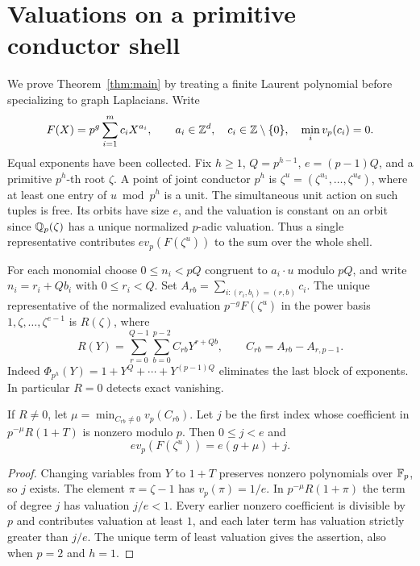 \section{Valuations on a primitive conductor shell}
\label{sec:local-shell}

We prove Theorem~\ref{thm:main} by treating a finite Laurent polynomial before
specializing to graph Laplacians. Write
\[
 F(X)=p^g\sum_{i=1}^m c_i X^{a_i},\qquad
 a_i\in\mathbb Z^d,\quad c_i\in\mathbb Z\setminus\{0\},\quad
 \min_i v_p(c_i)=0 .
\]
Equal exponents have been collected. Fix $h\ge1$, $Q=p^{h-1}$,
$e=(p-1)Q$, and a primitive $p^h$-th root $\zeta$.
A point of joint conductor $p^h$ is $\zeta^u=(\zeta^{u_1},\ldots,
\zeta^{u_d})$, where at least one entry of $u\bmod p^h$ is a unit.
The simultaneous unit action on such tuples is free. Its orbits
have size $e$, and the valuation is constant on an orbit since
$\mathbb Q_p(\zeta)$ has a unique normalized $p$-adic valuation.
Thus a single representative contributes $e v_p(F(\zeta^u))$ to the
sum over the whole shell.

For each monomial choose $0\le n_i<pQ$ congruent to $a_i\cdot u$
modulo $pQ$, and write $n_i=r_i+Qb_i$ with $0\le r_i<Q$.
Set $A_{rb}=\sum_{i:(r_i,b_i)=(r,b)}c_i$. The unique representative
of the normalized evaluation $p^{-g}F(\zeta^u)$ in the power basis
$1,\zeta,\ldots,\zeta^{e-1}$ is $R(\zeta)$, where
\[
 R(Y)=\sum_{r=0}^{Q-1}\sum_{b=0}^{p-2}
 C_{rb}Y^{r+Qb},\qquad C_{rb}=A_{rb}-A_{r,p-1}.
\]
Indeed $\Phi_{p^h}(Y)=1+Y^Q+\cdots+Y^{(p-1)Q}$ eliminates the
last block of exponents. In particular $R=0$ detects exact vanishing.

\begin{lemma}
\label{lem:orbit-val}
If $R\ne0$, let $\mu=\min_{C_{rb}\ne0} v_p(C_{rb})$.
Let $j$ be the first index whose coefficient in
$p^{-\mu}R(1+T)$ is nonzero modulo $p$. Then $0\le j<e$ and
\[
 e v_p(F(\zeta^u))=e(g+\mu)+j .
\]
\end{lemma}

\begin{proof}
Changing variables from $Y$ to $1+T$ preserves nonzero polynomials
over $\mathbb F_p$, so $j$ exists. The element $\pi=\zeta-1$ has
$v_p(\pi)=1/e$. In $p^{-\mu}R(1+\pi)$ the term of degree $j$
has valuation $j/e<1$. Every earlier nonzero coefficient is divisible
by $p$ and contributes valuation at least $1$, and each later term
has valuation strictly greater than $j/e$. The unique term of least
valuation gives the assertion, also when $p=2$ and $h=1$.
\end{proof}

